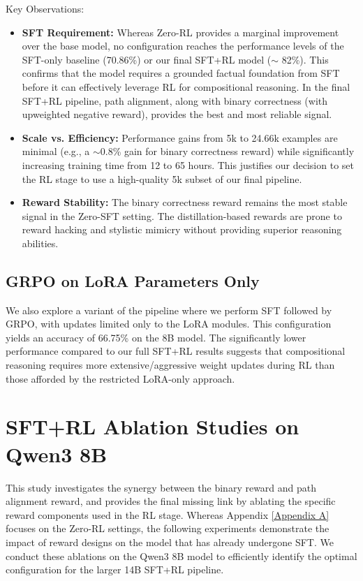 \documentclass{article}
\theoremstyle{plain}
\theoremstyle{definition}
\theoremstyle{remark}
\begin{document}
Key Observations:
\begin{itemize}
    \item \textbf{SFT Requirement:} Whereas Zero-RL provides a marginal improvement over the base model, no configuration reaches the performance levels of the SFT-only baseline (70.86\%) or our final SFT+RL model ($\sim$ 82\%). This confirms that the model requires a grounded factual foundation from SFT before it can effectively leverage RL for compositional reasoning. In the final SFT+RL pipeline, path alignment, along with binary correctness (with upweighted negative reward), provides the best and most reliable signal.

    \item \textbf{Scale vs. Efficiency:} Performance gains from 5k to 24.66k examples are minimal (e.g., a $\sim$0.8\% gain for binary correctness reward) while significantly increasing training time from 12 to 65 hours. This justifies our decision to set the RL stage to use a high-quality 5k subset of our final pipeline.

    \item \textbf{Reward Stability:} The binary correctness reward remains the most stable signal in the Zero-SFT setting. The distillation-based rewards are prone to reward hacking and stylistic mimicry without providing superior reasoning abilities.
\end{itemize}

\subsection{GRPO on LoRA Parameters Only}
We also explore a variant of the pipeline where we perform SFT followed by GRPO, with updates limited only to the LoRA modules. This configuration yields an accuracy of 66.75\% on the 8B model. The significantly lower performance compared to our full SFT+RL results suggests that compositional reasoning requires more extensive/aggressive weight updates during RL than those afforded by the restricted LoRA-only approach.

\newpage
\section{SFT+RL Ablation Studies on Qwen3 8B}
\label{Appendix B}
This study investigates the synergy between the binary reward and path alignment reward, and provides the final missing link by ablating the specific reward components used in the RL stage. Whereas Appendix \ref{Appendix A} focuses on the Zero-RL settings, the following experiments demonstrate the impact of reward designs on the model that has already undergone SFT. We conduct these ablations on the Qwen3 8B model to efficiently identify the optimal configuration for the larger 14B SFT+RL pipeline.
\end{document}
